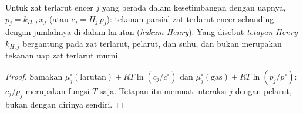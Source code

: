 \begin{proposition}\label{prop:b2:chemical-potential:henry}
Untuk zat terlarut encer $j$ yang berada dalam kesetimbangan dengan
uapnya, $p_j = k_{H,j}\,x_j$ (atau $c_j = H_j\,p_j$): tekanan parsial zat
terlarut encer sebanding dengan jumlahnya di dalam larutan (\emph{hukum
Henry}). Yang disebut \emph{tetapan
Henry} $k_{H,j}$ bergantung pada zat terlarut,
pelarut, dan suhu, dan bukan merupakan tekanan uap zat terlarut murni.
\end{proposition}

\begin{proof}
Samakan $\mu_j^\circ(\text{larutan}) + RT\ln(c_j/c^\circ)$ dan
$\mu_j^\circ(\text{gas}) + RT\ln(p_j/p^\circ)$: $c_j/p_j$ merupakan fungsi
$T$ saja. Tetapan itu memuat interaksi $j$ dengan pelarut, bukan dengan
dirinya sendiri.
\end{proof}

